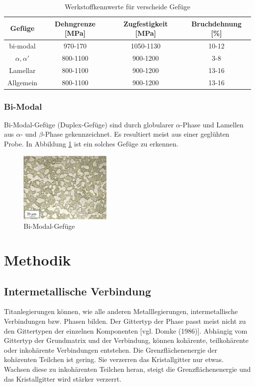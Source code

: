 \documentclass[a4paper, 11pt]{tubsreprt}
\begin{document}
\begin{table}
\begin{tabular}{c|c|c|c}
Gefüge & Dehngrenze [MPa] & Zugfestigkeit [MPa] & Bruchdehnung [\%] \\
\hline
bi-modal &	970-170 & 1050-1130 & 10-12 \\
\hline
{$\alpha, \alpha'$} & 800-1100 & 900-1200 & 3-8 \\
\hline
Lamellar & 800-1100 & 900-1200 & 13-16 \\
\hline
Allgemein & 800-1100 & 900-1200 & 13-16 \\

\end{tabular}
\label{Tabelle Spannungen Gefüge}
\caption{Werkstoffkennwerte für verscheide Gefüge}
\end{table}
\subsection{Bi-Modal}
Bi-Modal-Gefüge (Duplex-Gefüge) sind durch globularer $\alpha$-Phase und Lamellen aus $\alpha$- und $\beta$-Phase gekennzeichnet. Es resultiert meist aus einer geglühten Probe.  In Abbildung \ref{bimodal} ist ein solches Gefüge zu erkennen. 
\begin{figure}
\centering
\includegraphics[width=0.4\textwidth]{Bilder/Duplexgefuege.PNG}
\caption[Bi-Modal-Gefüge]{Bi-Modal-Gefüge\cite{Werkstoffdesign2012}}
\label{bimodal}
\end{figure}

\chapter{Methodik}
\section{Intermetallische Verbindung}
Titanlegierungen können, wie alle anderen Metalllegierungen, intermetallische Verbindungen bzw. Phasen bilden. Der Gittertyp der Phase passt meist nicht zu den Gittertypen der einzelnen Komponenten [vgl. Domke (1986)]. Abhängig vom Gittertyp der Grundmatrix und der Verbindung,  können kohärente, teilkohärente oder inkohärente Verbindungen entstehen. Die Grenzflächenenergie der kohärenten Teilchen ist gering. Sie verzerren das Kristallgitter nur etwas. Wachsen diese zu inkohärenten Teilchen heran, steigt die Grenzflächenenergie und das Kristallgitter wird stärker verzerrt.
\end{document}
